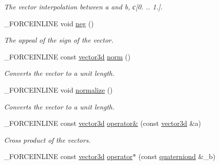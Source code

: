 \begin{DoxyCompactItemize}
\begin{DoxyCompactList}\small\item\em The vector interpolation between a and b, с\mbox{[}0. .. 1.\mbox{]}. \end{DoxyCompactList}\item 
\hypertarget{classbt_1_1vector3d_a46ceea6f2944ef7e427d646d989b9c0f}{\-\_\-\-F\-O\-R\-C\-E\-I\-N\-L\-I\-N\-E void \hyperlink{classbt_1_1vector3d_a46ceea6f2944ef7e427d646d989b9c0f}{neg} ()}\label{classbt_1_1vector3d_a46ceea6f2944ef7e427d646d989b9c0f}

\begin{DoxyCompactList}\small\item\em The appeal of the sign of the vector. \end{DoxyCompactList}\item 
\hypertarget{classbt_1_1vector3d_a0476397489b31ba438ba695f6a6e092e}{\-\_\-\-F\-O\-R\-C\-E\-I\-N\-L\-I\-N\-E const \hyperlink{classbt_1_1vector3d}{vector3d} \hyperlink{classbt_1_1vector3d_a0476397489b31ba438ba695f6a6e092e}{norm} ()}\label{classbt_1_1vector3d_a0476397489b31ba438ba695f6a6e092e}

\begin{DoxyCompactList}\small\item\em Converts the vector to a unit length. \end{DoxyCompactList}\item 
\hypertarget{classbt_1_1vector3d_a2170a0a4a3d994403f0d06a311d7a79b}{\-\_\-\-F\-O\-R\-C\-E\-I\-N\-L\-I\-N\-E void \hyperlink{classbt_1_1vector3d_a2170a0a4a3d994403f0d06a311d7a79b}{normalize} ()}\label{classbt_1_1vector3d_a2170a0a4a3d994403f0d06a311d7a79b}

\begin{DoxyCompactList}\small\item\em Converts the vector to a unit length. \end{DoxyCompactList}\item 
\hypertarget{classbt_1_1vector3d_a632604a33c4412cf5cce1235ea3c3f9c}{\-\_\-\-F\-O\-R\-C\-E\-I\-N\-L\-I\-N\-E const \hyperlink{classbt_1_1vector3d}{vector3d} \hyperlink{classbt_1_1vector3d_a632604a33c4412cf5cce1235ea3c3f9c}{operator\&} (const \hyperlink{classbt_1_1vector3d}{vector3d} \&a)}\label{classbt_1_1vector3d_a632604a33c4412cf5cce1235ea3c3f9c}

\begin{DoxyCompactList}\small\item\em Cross product of the vectors. \end{DoxyCompactList}\item 
\hypertarget{classbt_1_1vector3d_ad5c82d8f61f5bcbea5e625f1ed464c4f}{\-\_\-\-F\-O\-R\-C\-E\-I\-N\-L\-I\-N\-E const \hyperlink{classbt_1_1vector3d}{vector3d} \hyperlink{classbt_1_1vector3d_ad5c82d8f61f5bcbea5e625f1ed464c4f}{operator$\ast$} (const \hyperlink{classbt_1_1quaterniond}{quaterniond} \&\-\_\-b)}\label{classbt_1_1vector3d_ad5c82d8f61f5bcbea5e625f1ed464c4f}


\end{DoxyCompactItemize}
